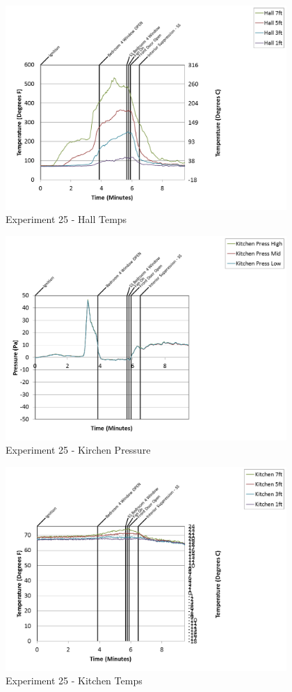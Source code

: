 \documentclass{article}
\begin{document}
\begin{appendices}
\clearpage

\begin{figure}[h!]
	\centering
	\includegraphics[height=3.05in]{0_Images/Results_Charts/Exp_25_Charts/HallTemps.png}
	\caption{Experiment 25 - Hall Temps}
\end{figure}


\begin{figure}[h!]
	\centering
	\includegraphics[height=3.05in]{0_Images/Results_Charts/Exp_25_Charts/KirchenPressure.png}
	\caption{Experiment 25 - Kirchen Pressure}
\end{figure}

\clearpage

\begin{figure}[h!]
	\centering
	\includegraphics[height=3.05in]{0_Images/Results_Charts/Exp_25_Charts/KitchenTemps.png}
	\caption{Experiment 25 - Kitchen Temps}
\end{figure}



\end{appendices}
\end{document}
